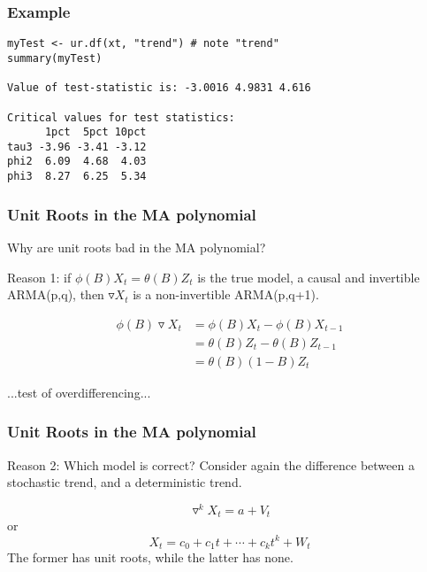 \documentclass{beamer}
\begin{document}

\begin{frame}[fragile]
\frametitle{Example}

\begin{verbatim}
myTest <- ur.df(xt, "trend") # note "trend"
summary(myTest)

Value of test-statistic is: -3.0016 4.9831 4.616 

Critical values for test statistics: 
      1pct  5pct 10pct
tau3 -3.96 -3.41 -3.12
phi2  6.09  4.68  4.03
phi3  8.27  6.25  5.34
\end{verbatim}


\end{frame}


\begin{frame}[fragile]
\frametitle{Unit Roots in the MA polynomial}

Why are unit roots bad in the MA polynomial?
\newline

Reason 1: if $\phi(B) X_t = \theta(B) Z_t$ is the true model, a causal and invertible ARMA(p,q), then $\triangledown X_t$ is a non-invertible ARMA(p,q+1).

\begin{align*}
\phi(B) \triangledown X_t &= \phi(B)X_t - \phi(B)X_{t-1}  \\
&= \theta(B)Z_t - \theta(B) Z_{t-1} \\
&= \theta(B)(1 - B)Z_t
\end{align*}

...test of overdifferencing...
\end{frame}


\begin{frame}[fragile]
\frametitle{Unit Roots in the MA polynomial}

Reason 2: Which model is correct? Consider again the difference between a stochastic trend, and a deterministic trend. 

\[
\triangledown^k X_t  = a + V_t
\]
or
\[
X_t = c_0 + c_1t + \cdots + c_k t^k + W_t
\]
The former has unit roots, while the latter has none.

\end{frame}
\end{document}
